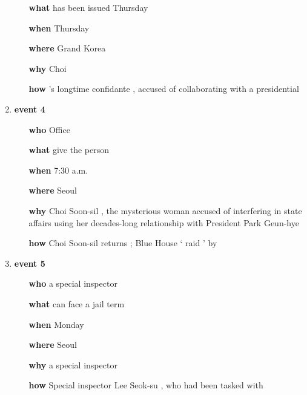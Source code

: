 \begin{enumerate}
\begin{enumerate}
\item[\textbf{	what	}]	has	been	issued	Thursday
\item[\textbf{	when	}]	Thursday
\item[\textbf{	where	}]	Grand	Korea
\item[\textbf{	why	}]	Choi
\item[\textbf{	how	}]	’s	longtime	confidante	,	accused	of	collaborating	with	a	presidential
\end{enumerate}
\item \textbf{	event		4	}
\begin{enumerate}
\item[\textbf{	who	}]	Office
\item[\textbf{	what	}]	give	the	person
\item[\textbf{	when	}]	7:30	a.m.
\item[\textbf{	where	}]	Seoul
\item[\textbf{	why	}]	Choi	Soon-sil	,	the	mysterious	woman	accused	of	interfering	in	state	affairs	using	her	decades-long	relationship	with	President	Park	Geun-hye
\item[\textbf{	how	}]	Choi	Soon-sil	returns	;	Blue	House	‘	raid	’	by
\end{enumerate}
\item \textbf{	event		5	}
\begin{enumerate}
\item[\textbf{	who	}]	a	special	inspector
\item[\textbf{	what	}]	can	face	a	jail	term
\item[\textbf{	when	}]	Monday
\item[\textbf{	where	}]	Seoul
\item[\textbf{	why	}]	a	special	inspector
\item[\textbf{	how	}]	Special	inspector	Lee	Seok-su	,	who	had	been	tasked	with
\end{enumerate}
\end{enumerate}

